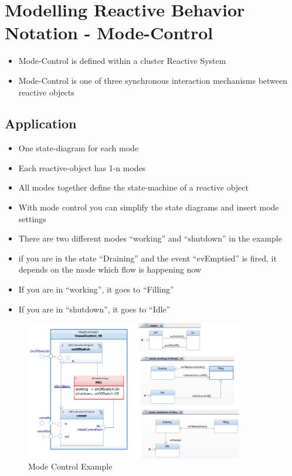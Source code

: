 \hypertarget{modelling-reactive-behavior-notation---mode-control}{%
\section{Modelling Reactive Behavior Notation -
Mode-Control}\label{modelling-reactive-behavior-notation---mode-control}}

\begin{itemize}
\tightlist
\item
  Mode-Control is defined within a cluster Reactive System
\item
  Mode-Control is one of three synchronous interaction mechanisms
  between reactive objects
\end{itemize}

\hypertarget{application}{%
\subsection{Application}\label{application}}

\begin{itemize}
\tightlist
\item
  One state-diagram for each mode
\item
  Each reactive-object has 1-n modes
\item
  All modes together define the state-machine of a reactive object
\item
  With mode control you can simplify the state diagrams and insert mode
  settings
\item
  There are two different modes ``working'' and ``shutdown'' in the
  example
\item
  if you are in the state ``Draining'' and the event ``evEmptied'' is
  fired, it depends on the mode which flow is happening now
\item
  If you are in ``working'', it goes to ``Filling''
\item
  If you are in ``shutdown'', it goes to ``Idle''
\end{itemize}

\begin{figure}[H]
\centering
\includegraphics[width=0.85\textwidth]{figures/modecontrolCiro.png}
\caption{Mode Control Example}
\end{figure}

